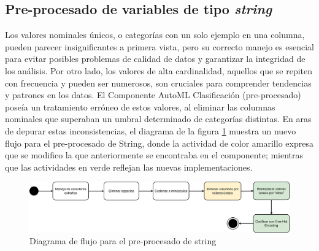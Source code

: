\subsection{Pre-procesado de variables de tipo \textit{string}}
Los valores nominales únicos, o categorías con un solo ejemplo en una columna, pueden parecer insignificantes a primera vista, pero su correcto manejo es esencial para evitar posibles problemas de calidad de datos y garantizar la integridad de los análisis. Por otro lado, los valores de alta cardinalidad, aquellos que se repiten con frecuencia y pueden ser numerosos, son cruciales para comprender tendencias y patrones en los datos. El Componente AutoML  Clasificación (pre-procesado) poseía un tratamiento erróneo de estos valores, al eliminar las columnas nominales que superaban un umbral determinado de categorías distintas. 
En aras de depurar estas inconsistencias, el diagrama de la figura \ref{fig:string-preprocs} muestra un nuevo flujo para el pre-procesado de String, donde la actividad de color amarillo expresa que se modifico la que anteriormente se encontraba en el componente; mientras que las actividades en verde reflejan las nuevas implementaciones.

\begin{figure}[H]
	\centering
	\includegraphics[width=0.95\linewidth]{"figuras/capi 2/preprocesado/string preprocs.drawio"}
	\caption{Diagrama de flujo para el pre-procesado de string}
	\label{fig:string-preprocs}
\end{figure}

